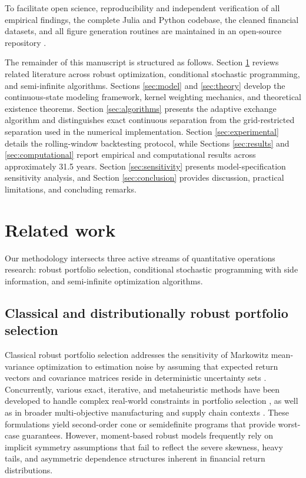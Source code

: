 \documentclass[smallcondensed]{svjour3}
\begin{document}
To facilitate open science, reproducibility and independent verification of all empirical findings, the complete Julia and Python codebase, the cleaned financial datasets, and all figure generation routines are maintained in an open-source repository \cite{bezoui2026robust}.

The remainder of this manuscript is structured as follows. Section \ref{sec:related} reviews related literature across robust optimization, conditional stochastic programming, and semi-infinite algorithms. Sections \ref{sec:model} and \ref{sec:theory} develop the continuous-state modeling framework, kernel weighting mechanics, and theoretical existence theorems. Section \ref{sec:algorithms} presents the adaptive exchange algorithm and distinguishes exact continuous separation from the grid-restricted separation used in the numerical implementation. Section \ref{sec:experimental} details the rolling-window backtesting protocol, while Sections \ref{sec:results} and \ref{sec:computational} report empirical and computational results across approximately 31.5 years. Section \ref{sec:sensitivity} presents model-specification sensitivity analysis, and Section \ref{sec:conclusion} provides discussion, practical limitations, and concluding remarks.

\section{Related work}\label{sec:related}
Our methodology intersects three active streams of quantitative operations research: robust portfolio selection, conditional stochastic programming with side information, and semi-infinite optimization algorithms.

\subsection{Classical and distributionally robust portfolio selection}
Classical robust portfolio selection addresses the sensitivity of Markowitz mean-variance optimization to estimation noise by assuming that expected return vectors and covariance matrices reside in deterministic uncertainty sets \cite{goldfarb2003robust, fabozzi2007robust}. Concurrently, various exact, iterative, and metaheuristic methods have been developed to handle complex real-world constraints in portfolio selection \cite{bezoui2019iterative, regaigui2025memetic}, as well as in broader multi-objective manufacturing and supply chain contexts \cite{bezoui2024hybrid}. These formulations yield second-order cone or semidefinite programs that provide worst-case guarantees. However, moment-based robust models frequently rely on implicit symmetry assumptions that fail to reflect the severe skewness, heavy tails, and asymmetric dependence structures inherent in financial return distributions.
\end{document}
